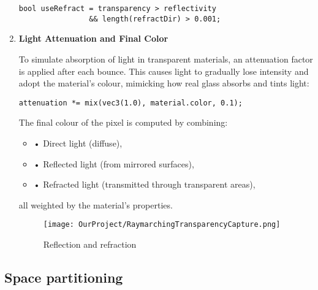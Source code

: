 \documentclass{rapportcs}
\begin{document}
\begin{enumerate}
        \begin{lstlisting}[style=cppstyle]
bool useRefract = transparency > reflectivity 
                && length(refractDir) > 0.001;
        \end{lstlisting}

        \newpage
    

      \item \textbf{Light Attenuation and Final Color}
        
        To simulate absorption of light in transparent materials, an attenuation factor is applied after each bounce. This causes light to gradually lose intensity and adopt the material’s colour, mimicking how real glass absorbs and tints light:

        \begin{lstlisting}[style=cppstyle]
attenuation *= mix(vec3(1.0), material.color, 0.1);
        \end{lstlisting}

        \noindent The final colour of the pixel is computed by combining:
        \begin{itemize}
            \item[\hspace{1cm}] • Direct light (diffuse),
            \item[\hspace{1cm}] • Reflected light (from mirrored surfaces),
            \item[\hspace{1cm}] • Refracted light (transmitted through transparent areas), 
        \end{itemize}

        \noindent all weighted by the material's properties.
        
        \begin{figure}[H]
            \centering
            \texttt{[image: OurProject/RaymarchingTransparencyCapture.png]}
            \caption{Reflection and refraction}
            \label{fig:label_image}
        \end{figure}

        \newpage

    \end{enumerate}


\subsection{Space partitioning}
\end{document}
